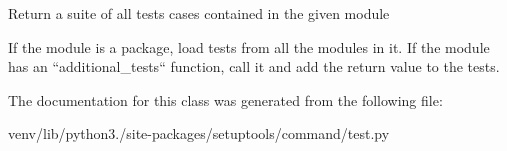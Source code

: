\begin{DoxyVerb}Return a suite of all tests cases contained in the given module

If the module is a package, load tests from all the modules in it.
If the module has an ``additional_tests`` function, call it and add
the return value to the tests.
\end{DoxyVerb}
 

The documentation for this class was generated from the following file\+:\begin{DoxyCompactItemize}
\item 
venv/lib/python3./site-\/packages/setuptools/command/test.\+py\end{DoxyCompactItemize}

